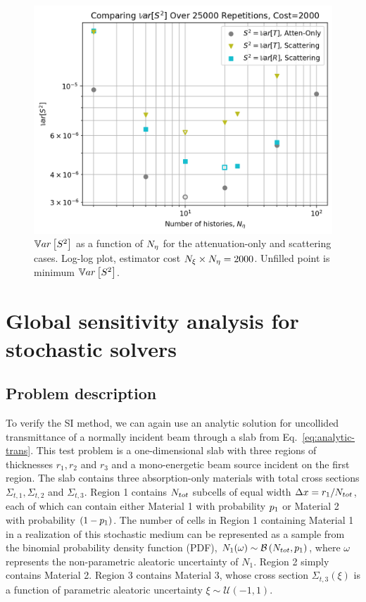 \begin{figure}[ht]
    \centering
    \includegraphics[width=\textwidth]{Figures/2000-scat-vs-atten.png}
    \caption{$\mathbb{V}ar\left[S^2\right]$ as a function of ${N_\eta}$ for the attenuation-only and scattering cases. Log-log plot, estimator cost ${N_\xi} \times {N_\eta}=2000$. Unfilled point is minimum $\mathbb{V}ar\left[S^2\right]$.}
    \label{fig:compare2000}
\end{figure}


\section{Global sensitivity analysis for stochastic solvers}
\subsection{Problem description} \label{sec:closed_form}
To verify the SI method, we can again use an analytic solution for uncollided transmittance of a normally incident beam through a slab from Eq.~\eqref{eq:analytic-trans}. This test problem is a one-dimensional slab with three regions of thicknesses $r_1, r_2$ and $r_3$ and a mono-energetic beam source incident on the first region.
The slab contains three absorption-only materials with total cross sections $\Sigma_{t,1}, \Sigma_{t,2}$ and $\Sigma_{t,3}$.
Region 1 contains $N_{tot}$ subcells of equal width $\Delta x = r_1 / N_{tot}$, each of which can contain either Material 1 with probability $p_1$ or Material 2 with probability $\left( 1 - p_1 \right)$.
The number of cells in Region 1 containing Material 1 in a realization of this stochastic medium can be represented as a sample from the binomial probability density function (PDF), $N_1(\omega) \sim \mathcal{B}\left( N_{tot}, p_1 \right)$, where $\omega$ represents the non-parametric aleatoric uncertainty of $N_1$.
Region 2 simply contains Material 2.
Region 3 contains Material 3, whose cross section $\Sigma_{t,3}(\xi)$ is a function of parametric aleatoric uncertainty $\xi \sim \mathcal{U}\left(-1, 1 \right)$. 

